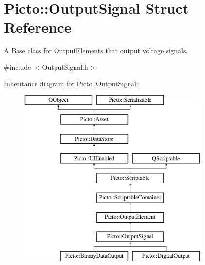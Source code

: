 \hypertarget{struct_picto_1_1_output_signal}{\section{Picto\-:\-:Output\-Signal Struct Reference}
\label{struct_picto_1_1_output_signal}
}


A Base class for Output\-Elements that output voltage signals.  




{\ttfamily \#include $<$Output\-Signal.\-h$>$}

Inheritance diagram for Picto\-:\-:Output\-Signal\-:\begin{figure}[H]
\begin{center}
\leavevmode
\includegraphics[height=9.000000cm]{struct_picto_1_1_output_signal}
\end{center}
\end{figure}
